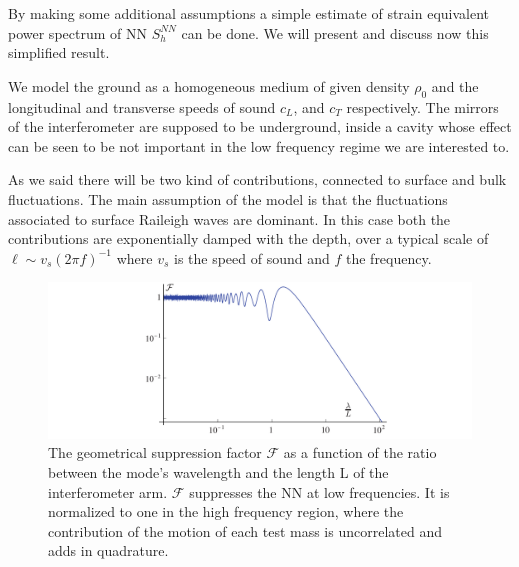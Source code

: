 By making some additional assumptions a simple estimate of strain equivalent power spectrum of NN $S_{h}^{NN}$ can be done. We will present and discuss now this simplified result.

We model the ground as a homogeneous medium of given density $\rho_{0}$ and the longitudinal and transverse speeds of sound $c_{L}$, and $c_{T}$ respectively. The mirrors of the interferometer are supposed to be underground, inside a cavity whose effect can be seen to be not important in the low frequency regime we are interested to.

As we said there will be two kind of contributions, connected to surface and bulk fluctuations. The main assumption of the model is that the fluctuations associated to surface Raileigh waves are dominant. In this case both the contributions are exponentially damped with the depth, over a typical scale of $\ell \sim v_s (2\pi f)^{-1}$ where $v_s$ is the speed of sound and $f$ the frequency.

\begin{figure}[t!]
	\begin{center} 
		\includegraphics[width=16cm]{./Sec_SiteInfra/Figures/GeometricFactor.pdf} 
		\caption{The geometrical suppression factor $\mathcal{F}$ as a function of the ratio between the mode's wavelength and the length L of the interferometer arm. $\mathcal{F}$ suppresses the NN at low frequencies. It is normalized to one in the high frequency region, where the contribution of the motion of each test mass is uncorrelated and adds in quadrature.} 
		 \label{fig3.7} 
	\end{center}
\end{figure}



